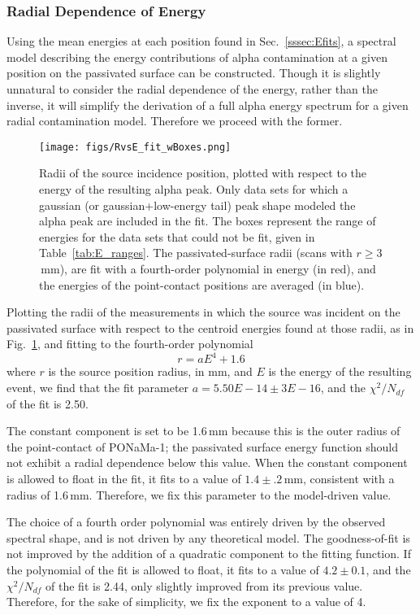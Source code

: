 \documentclass[groupedaddress,rmp,amsmath,amssymb,bibnotes,altaffilletter,twocolumn]{revtex4-1}
\begin{document}
\subsubsection{Radial Dependence of Energy}\label{sssec:spec_fit}
Using the mean energies at each position found in Sec.~\ref{sssec:Efits}, a spectral model describing the energy contributions of alpha contamination at a given position on the passivated surface can be constructed. Though it is slightly unnatural to consider the radial dependence of the energy, rather than the inverse, it will simplify the derivation of a full alpha energy spectrum for a given radial contamination model. Therefore we proceed with the former.

\begin{figure}[]
 \centering
 \texttt{[image: figs/RvsE\_fit\_wBoxes.png]}
 \caption{Radii of the source incidence position, plotted with respect to the energy of the resulting alpha peak. Only data sets for which a gaussian (or gaussian+low-energy tail) peak shape modeled the alpha peak are included in the fit. The boxes represent the range of energies for the data sets that could not be fit, given in Table~\ref{tab:E_ranges}. The passivated-surface radii (scans with $r\geq3$\,mm), are fit with a fourth-order polynomial in energy (in red), and the energies of the point-contact positions are averaged (in blue).} 
 \label{fig:RvsE_fit}
\end{figure}

Plotting the radii of the measurements in which the source was incident on the passivated surface with respect to the centroid energies found at those radii, as in Fig.~\ref{fig:RvsE_fit}, and fitting to the fourth-order polynomial
$$ r = aE^4 + 1.6 $$
where $r$ is the source position radius, in mm, and $E$ is the energy of the resulting event, we find that the fit parameter $a = 5.50E-14\pm3E-16$, and the $\chi^2/N_{df}$ of the fit is 2.50.

The constant component is set to be 1.6\,mm because this is the outer radius of the point-contact of PONaMa-1; the passivated surface energy function should not exhibit a radial dependence below this value. When the constant component is allowed to float in the fit, it fits to a value of $1.4\pm.2$\,mm, consistent with a radius of 1.6\,mm. Therefore, we fix this parameter to the model-driven value. 

The choice of a fourth order polynomial was entirely driven by the observed spectral shape, and is not driven by any theoretical model. The goodness-of-fit is not improved by the addition of a quadratic component to the fitting function. If the polynomial of the fit is allowed to float, it fits to a value of $4.2\pm0.1$, and the $\chi^2/N_{df}$ of the fit is 2.44, only slightly improved from its previous value. Therefore, for the sake of simplicity, we fix the exponent to a value of 4.  
\end{document}
